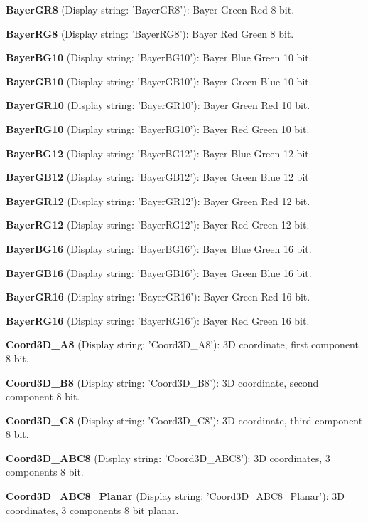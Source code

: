 \begin{DoxyItemize}
\item {\bfseries Bayer\+G\+R8} (Display string\+: 'Bayer\+G\+R8')\+: Bayer Green Red 8 bit.
\item {\bfseries Bayer\+R\+G8} (Display string\+: 'Bayer\+R\+G8')\+: Bayer Red Green 8 bit.
\item {\bfseries Bayer\+B\+G10} (Display string\+: 'Bayer\+B\+G10')\+: Bayer Blue Green 10 bit.
\item {\bfseries Bayer\+G\+B10} (Display string\+: 'Bayer\+G\+B10')\+: Bayer Green Blue 10 bit.
\item {\bfseries Bayer\+G\+R10} (Display string\+: 'Bayer\+G\+R10')\+: Bayer Green Red 10 bit.
\item {\bfseries Bayer\+R\+G10} (Display string\+: 'Bayer\+R\+G10')\+: Bayer Red Green 10 bit.
\item {\bfseries Bayer\+B\+G12} (Display string\+: 'Bayer\+B\+G12')\+: Bayer Blue Green 12 bit
\item {\bfseries Bayer\+G\+B12} (Display string\+: 'Bayer\+G\+B12')\+: Bayer Green Blue 12 bit
\item {\bfseries Bayer\+G\+R12} (Display string\+: 'Bayer\+G\+R12')\+: Bayer Green Red 12 bit.
\item {\bfseries Bayer\+R\+G12} (Display string\+: 'Bayer\+R\+G12')\+: Bayer Red Green 12 bit.
\item {\bfseries Bayer\+B\+G16} (Display string\+: 'Bayer\+B\+G16')\+: Bayer Blue Green 16 bit.
\item {\bfseries Bayer\+G\+B16} (Display string\+: 'Bayer\+G\+B16')\+: Bayer Green Blue 16 bit.
\item {\bfseries Bayer\+G\+R16} (Display string\+: 'Bayer\+G\+R16')\+: Bayer Green Red 16 bit.
\item {\bfseries Bayer\+R\+G16} (Display string\+: 'Bayer\+R\+G16')\+: Bayer Red Green 16 bit.
\item {\bfseries Coord3\+D\+\_\+\+A8} (Display string\+: 'Coord3\+D\+\_\+\+A8')\+: 3\+D coordinate, first component 8 bit.
\item {\bfseries Coord3\+D\+\_\+\+B8} (Display string\+: 'Coord3\+D\+\_\+\+B8')\+: 3\+D coordinate, second component 8 bit.
\item {\bfseries Coord3\+D\+\_\+\+C8} (Display string\+: 'Coord3\+D\+\_\+\+C8')\+: 3\+D coordinate, third component 8 bit.
\item {\bfseries Coord3\+D\+\_\+\+A\+B\+C8} (Display string\+: 'Coord3\+D\+\_\+\+A\+B\+C8')\+: 3\+D coordinates, 3 components 8 bit.
\item {\bfseries Coord3\+D\+\_\+\+A\+B\+C8\+\_\+\+Planar} (Display string\+: 'Coord3\+D\+\_\+\+A\+B\+C8\+\_\+\+Planar')\+: 3\+D coordinates, 3 components 8 bit planar.

\end{DoxyItemize}
